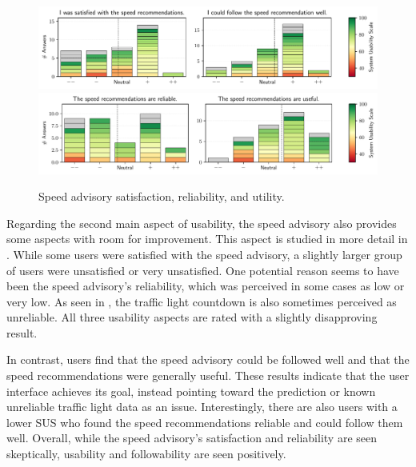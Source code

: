 \begin{figure}[t]
\caption{Speed advisory satisfaction, reliability, and utility.}\label{fig:speed-recommendations-satisfaction}
\includegraphics[width=\linewidth]{images/app-usability-questions-speed-recommendations-satisfaction.pdf}
\\
\includegraphics[width=\linewidth]{images/app-usability-questions-speed-recommendations-reliability.pdf}
\end{figure}

Regarding the second main aspect of usability, the speed advisory also provides some aspects with room for improvement. This aspect is studied in more detail in . While some users were satisfied with the speed advisory, a slightly larger group of users were unsatisfied or very unsatisfied. One potential reason seems to have been the speed advisory's reliability, which was perceived in some cases as low or very low. As seen in  , the traffic light countdown is also sometimes perceived as unreliable. All three usability aspects are rated with a slightly disapproving result.

In contrast, users find that the speed advisory could be followed well and that the speed recommendations were generally useful. These results indicate that the user interface achieves its goal, instead pointing toward the prediction or known unreliable traffic light data as an issue. Interestingly, there are also users with a lower SUS who found the speed recommendations reliable and could follow them well. Overall, while the speed advisory's satisfaction and reliability are seen skeptically, usability and followability are seen positively.

